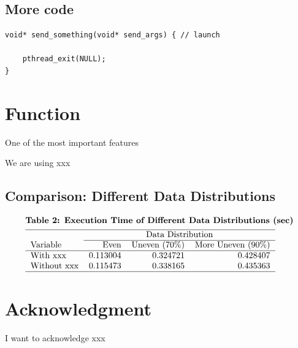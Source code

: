 \documentclass[11pt,A4]{article}
\begin{document}
\subsection{More code}



\lstset{language=C}
\lstset{breaklines=true}
\begin{lstlisting}
void* send_something(void* send_args) { // launch
    
    pthread_exit(NULL);
}
\end{lstlisting}




\section{Function}
One of the most important features

We are using xxx



\subsection{Comparison: Different Data Distributions}

$$
\begin{aligned}
&\textbf{Table 2: Execution Time of Different Data Distributions (sec)}\\
&\begin{tabular}{lrrr}
\hline & \multicolumn{3}{c}{Data Distribution} \\
\cline { 2 - 4 } Variable & Even & Uneven (70\%) & More Uneven (90\%) \\
\hline With xxx & 0.113004 & 0.324721 & 0.428407 \\
Without xxx & 0.115473 & 0.338165 & 0.435363\\
\hline
\end{tabular}
\end{aligned}
$$


\section{Acknowledgment}

I want to acknowledge xxx



\printbibliography[
heading=bibintoc,
] %
\end{document}
